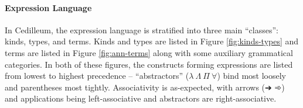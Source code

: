 \documentclass{article}
\begin{document}
\paragraph{Expression Language}

In Cedilleum, the expression language is stratified into three main ``classes'':
kinds, types, and terms. Kinds and types are listed in Figure
\ref{fig:kinds-types} and terms are listed in Figure \ref{fig:ann-terms} along
with some auxiliary grammatical categories. In both of these figures, the
constructs forming expressions are listed from lowest to highest precedence --
``abstractors'' ($\lambda\ \Lambda\ \Pi\ \forall$) bind most loosely and
parentheses most tightly. Associativity is as-expected, with arrows (➔ ➾) and
applications being left-associative and abstractors are right-associative.
\end{document}
